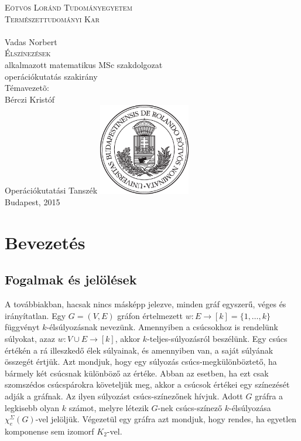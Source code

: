 \documentclass[12pt, a4paper]{report}
\theoremstyle{remark}
\theoremstyle{definition}
\begin{document}

\begin{titlepage}
\begin{center}
{\huge \textsc{Eötvös Loránd Tudományegyetem \\ Természettudományi Kar \\}}
\hrulefill \\[2.5cm]
{\huge Vadas Norbert} \\[0.7cm]
{\Huge \textsc{Élszínezések}} \\[0.7cm]
alkalmazott matematikus MSc szakdolgozat \\[0.1cm]
operációkutatás szakirány \\[2.2cm]
{\large Témavezetõ:} \\[0.4cm]
{\Large Bérczi Kristóf} \\[0.3cm] 
{\Large Operációkutatási Tanszék}
\vfill
\includegraphics[width=0.3\textwidth]{./images/elte_cimer_ff} \\[0.5cm]
{\large Budapest, 2015}
\end{center}
\end{titlepage}

\tableofcontents

\chapter{Bevezetés} 

\section{Fogalmak és jelölések}
A továbbiakban, hacsak nincs másképp jelezve, minden gráf egyszerű, véges és irányítatlan. Egy $G = (V, E)$ gráfon értelmezett $w: E \rightarrow [k] = \lbrace 1, \ldots, k \rbrace$ függvényt $k$-élsúlyozásnak nevezünk. Amennyiben a csúcsokhoz is rendelünk súlyokat, azaz $w: V \cup E \rightarrow [k]$, akkor $k$-teljes-súlyozásról beszélünk. Egy csúcs értékén a rá illeszkedő élek súlyainak, és amennyiben van, a saját súlyának összegét értjük. Azt mondjuk, hogy egy súlyozás csúcs-megkülönböztető, ha bármely két csúcsnak különböző az értéke. Abban az esetben, ha ezt csak szomszédos csúcspárokra követeljük meg, akkor a csúcsok értékei egy színezését adják a gráfnak. Az ilyen súlyozást csúcs-színezőnek hívjuk. Adott $G$ gráfra a legkisebb olyan $k$ számot, melyre létezik $G$-nek csúcs-színező $k$-élsúlyozása $\chi_e^{\Sigma}(G)$-vel jelöljük. Végezetül egy gráfra azt mondjuk, hogy rendes, ha egyetlen komponense sem izomorf $K_2$-vel.
\end{document}
